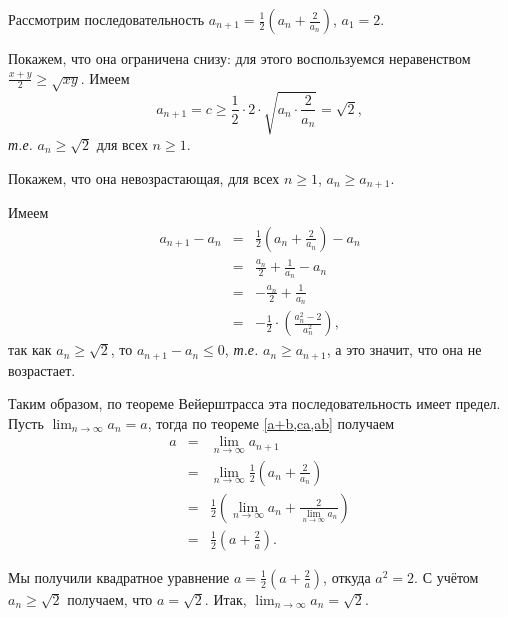 \begin{example}
    Рассмотрим последовательность $a_{n+1} = \frac{1}{2}\left(a_n + \frac{2}{a_n} \right)$, $a_1 = 2$.

    Покажем, что она ограничена снизу: для этого воспользуемся неравенством $\frac{x+y}{2} \ge \sqrt{xy}$. Имеем
    \[
     a_{n+1} = c \ge \frac{1}{2}\cdot 2 \cdot \sqrt{a_n \cdot \frac{2}{a_n}} = \sqrt{2},
    \]
\textit{т.е.} $a_n \ge \sqrt{2}$ для всех $n \ge 1$.

Покажем, что она невозрастающая, \ie для всех $n\ge 1$, $a_{n} \ge a_{n+1}$.

Имеем
 \begin{eqnarray*}
     a_{n+1} - a_n &=& \frac{1}{2}\left(a_n + \frac{2}{a_n} \right) - a_n \\
     &= & \frac{a_n}{2} + \frac{1}{a_n} - a_n \\
     &=& -\frac{a_n}{2} + \frac{1}{a_n} \\
     &=& -\frac{1}{2}\cdot\left( \frac{a_n^2 - 2}{a_n^2}\right),
 \end{eqnarray*}
так как $a_n \ge \sqrt{2}$, то $a_{n+1} - a_n \le 0$, \textit{т.е.} $a_{n} \ge a_{n+1}$, а это значит, что она не возрастает.

   Таким образом, по теореме Вейерштрасса эта последовательность имеет предел. Пусть $\lim_{n\to \infty}a_n =a$, тогда по теореме \ref{a+b,ca,ab} получаем
    \begin{eqnarray*}
        a &=& \lim_{n \to \infty}a_{n+1} \\
        &=&\lim_{n \to \infty} \frac{1}{2} \left(a_n+ \frac{2}{a_n} \right) \\
        &=&  \frac{1}{2}\left( \lim_{n \to \infty} a_n + \frac{2}{\lim_{n \to \infty} a_n} \right) \\
        &=&\frac{1}{2}\left( a + \frac{2}{a}\right).
    \end{eqnarray*}

Мы получили квадратное уравнение $a = \frac{1}{2}\left(a + \frac{2}{a} \right)$, откуда $a^2 = 2$. С учётом $a_n \ge \sqrt{2}$ получаем, что $a = \sqrt{2}$. Итак, $\lim_{n \to \infty}a_n = \sqrt{2}.$
\end{example}



